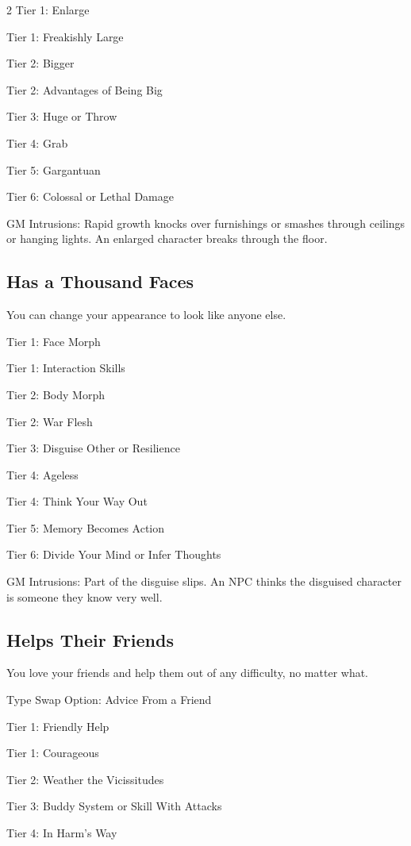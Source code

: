 \begin{multicols}{2}
Tier 1: Enlarge

Tier 1: Freakishly Large

Tier 2: Bigger

Tier 2: Advantages of Being Big

Tier 3: Huge or Throw

Tier 4: Grab

Tier 5: Gargantuan

Tier 6: Colossal or Lethal Damage

GM Intrusions: Rapid growth knocks over furnishings or smashes through ceilings or hanging lights. An enlarged character breaks through the floor.

\subsection{Has a Thousand Faces}

You can change your appearance to look like anyone else.

Tier 1: Face Morph

Tier 1: Interaction Skills 

Tier 2: Body Morph

Tier 2: War Flesh

Tier 3: Disguise Other or Resilience

Tier 4: Ageless

Tier 4: Think Your Way Out 

Tier 5: Memory Becomes Action 

Tier 6: Divide Your Mind or Infer Thoughts 

GM Intrusions: Part of the disguise slips. An NPC thinks the disguised character is someone they know very well.

\subsection{Helps Their Friends}

You love your friends and help them out of any difficulty, no matter what.

Type Swap Option: Advice From a Friend

Tier 1: Friendly Help

Tier 1: Courageous

Tier 2: Weather the Vicissitudes

Tier 3: Buddy System or Skill With Attacks

Tier 4: In Harm’s Way


\end{multicols}
